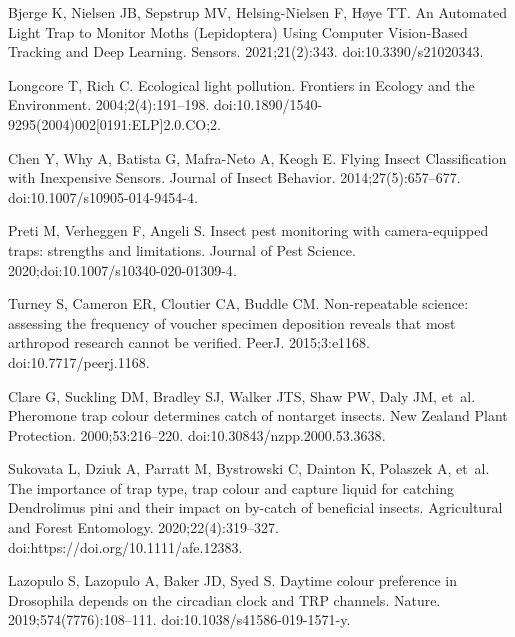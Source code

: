\documentclass[12pt]{article}
\begin{document}
\begin{thebibliography}{10}
	Bjerge K, Nielsen JB, Sepstrup MV, Helsing-Nielsen F, Høye TT.
	\newblock An {Automated} {Light} {Trap} to {Monitor} {Moths} ({Lepidoptera})
	{Using} {Computer} {Vision}-{Based} {Tracking} and {Deep} {Learning}.
	\newblock Sensors. 2021;21(2):343.
	\newblock doi:{10.3390/s21020343}.
	
	Longcore T, Rich C.
	\newblock Ecological light pollution.
	\newblock Frontiers in Ecology and the Environment. 2004;2(4):191--198.
	\newblock doi:{10.1890/1540-9295(2004)002[0191:ELP]2.0.CO;2}.
	
	Chen Y, Why A, Batista G, Mafra-Neto A, Keogh E.
	\newblock Flying {Insect} {Classification} with {Inexpensive} {Sensors}.
	\newblock Journal of Insect Behavior. 2014;27(5):657--677.
	\newblock doi:{10.1007/s10905-014-9454-4}.
	
	Preti M, Verheggen F, Angeli S.
	\newblock Insect pest monitoring with camera-equipped traps: strengths and
	limitations.
	\newblock Journal of Pest Science. 2020;doi:{10.1007/s10340-020-01309-4}.
	
	Turney S, Cameron ER, Cloutier CA, Buddle CM.
	\newblock Non-repeatable science: assessing the frequency of voucher specimen
	deposition reveals that most arthropod research cannot be verified.
	\newblock PeerJ. 2015;3:e1168.
	\newblock doi:{10.7717/peerj.1168}.
	
	Clare G, Suckling DM, Bradley SJ, Walker JTS, Shaw PW, Daly JM, et~al.
	\newblock Pheromone trap colour determines catch of nontarget insects.
	\newblock New Zealand Plant Protection. 2000;53:216--220.
	\newblock doi:{10.30843/nzpp.2000.53.3638}.
	
	Sukovata L, Dziuk A, Parratt M, Bystrowski C, Dainton K, Polaszek A, et~al.
	\newblock The importance of trap type, trap colour and capture liquid for
	catching {Dendrolimus} pini and their impact on by-catch of beneficial
	insects.
	\newblock Agricultural and Forest Entomology. 2020;22(4):319--327.
	\newblock doi:{https://doi.org/10.1111/afe.12383}.
	
	Lazopulo S, Lazopulo A, Baker JD, Syed S.
	\newblock Daytime colour preference in {Drosophila} depends on the circadian
	clock and {TRP} channels.
	\newblock Nature. 2019;574(7776):108--111.
	\newblock doi:{10.1038/s41586-019-1571-y}.
	

\end{thebibliography}
\end{document}
